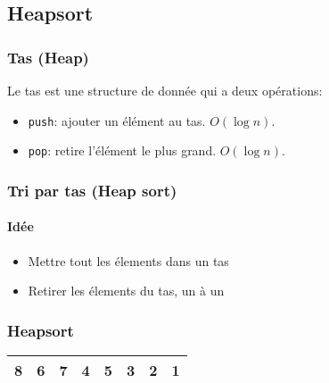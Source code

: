 \subsection[Heap]{Heapsort}

\begin{frame}
	\frametitle{Tas (Heap)}
	Le tas est une structure de donnée qui a deux opérations:
	\begin{itemize}
		\item \texttt{push}: ajouter un élément au tas. $O(\log n)$.
		\item \texttt{pop}: retire l'élément le plus grand. $O(\log n)$.
	\end{itemize}
\end{frame}

\begin{frame}
\frametitle{Tri par tas (Heap sort)}
\framesubtitle{Idée}
\begin{itemize}
\item Mettre tout les élements dans un tas
\item Retirer les élements du tas, un à un
\end{itemize}
\end{frame}

\begin{frame}
\frametitle{Heapsort}
\begin{table}
\begin{tabular}{| c | c | c | c | c | c | c | c |}
\hline
8 & 6 & 7 & 4 & 5 & 3 & 2 & 1 \\ 
\hline
\end{tabular}
\end{table}

\end{frame}

